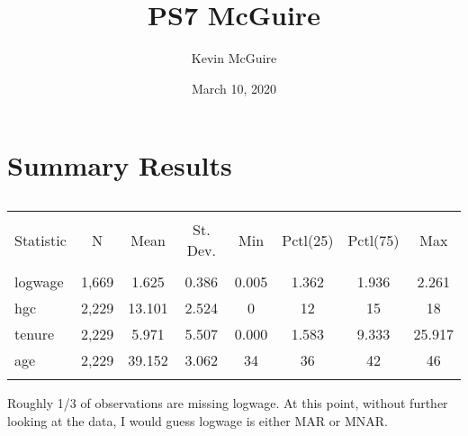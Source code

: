 \documentclass{article}
\title{PS7 McGuire}
\author{Kevin McGuire}
\date{March 10, 2020}
\begin{document}
\maketitle

\section{Summary Results}

\begin{table}[!htbp] \centering 
  \caption{} 
  \label{} 
\begin{tabular}{@{\extracolsep{5pt}}lccccccc} 
\\[-1.8ex]\hline 
\hline \\[-1.8ex] 
Statistic & \multicolumn{1}{c}{N} & \multicolumn{1}{c}{Mean} & \multicolumn{1}{c}{St. Dev.} & \multicolumn{1}{c}{Min} & \multicolumn{1}{c}{Pctl(25)} & \multicolumn{1}{c}{Pctl(75)} & \multicolumn{1}{c}{Max} \\ 
\hline \\[-1.8ex] 
logwage & 1,669 & 1.625 & 0.386 & 0.005 & 1.362 & 1.936 & 2.261 \\ 
hgc & 2,229 & 13.101 & 2.524 & 0 & 12 & 15 & 18 \\ 
tenure & 2,229 & 5.971 & 5.507 & 0.000 & 1.583 & 9.333 & 25.917 \\ 
age & 2,229 & 39.152 & 3.062 & 34 & 36 & 42 & 46 \\ 
\hline \\[-1.8ex] 
\end{tabular} 
\end{table} 

Roughly 1/3 of observations are missing logwage. At this point, without further looking at the data, I would guess logwage is either MAR or MNAR.
\end{document}
